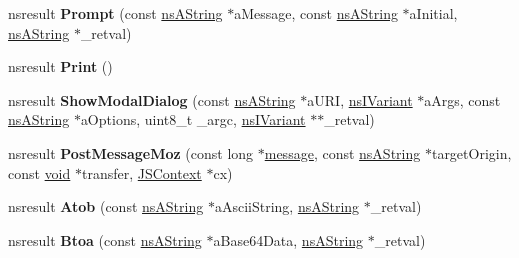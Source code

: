 \begin{DoxyCompactItemize}
\item 
\mbox{\label{interfacens_i_d_o_m_window_a2884a167e66df8a1244ed3f14c9dc761}} 
nsresult {\bfseries Prompt} (const \hyperlink{structns_string_container}{ns\+A\+String} $\ast$a\+Message, const \hyperlink{structns_string_container}{ns\+A\+String} $\ast$a\+Initial, \hyperlink{structns_string_container}{ns\+A\+String} $\ast$\+\_\+retval)
\item 
\mbox{\label{interfacens_i_d_o_m_window_a48d51e6f241246ffabd195caabcfeed3}} 
nsresult {\bfseries Print} ()
\item 
\mbox{\label{interfacens_i_d_o_m_window_a8fa1c4fe9b3890a746e86c06de2c99d9}} 
nsresult {\bfseries Show\+Modal\+Dialog} (const \hyperlink{structns_string_container}{ns\+A\+String} $\ast$a\+U\+RI, \hyperlink{interfacens_i_variant}{ns\+I\+Variant} $\ast$a\+Args, const \hyperlink{structns_string_container}{ns\+A\+String} $\ast$a\+Options, uint8\+\_\+t \+\_\+argc, \hyperlink{interfacens_i_variant}{ns\+I\+Variant} $\ast$$\ast$\+\_\+retval)
\item 
\mbox{\label{interfacens_i_d_o_m_window_afebd29a37c05ebaa535d734a63daecc9}} 
nsresult {\bfseries Post\+Message\+Moz} (const long $\ast$\hyperlink{structmessage}{message}, const \hyperlink{structns_string_container}{ns\+A\+String} $\ast$target\+Origin, const \hyperlink{interfacevoid}{void} $\ast$transfer, \hyperlink{interfacevoid}{J\+S\+Context} $\ast$cx)
\item 
\mbox{\label{interfacens_i_d_o_m_window_a3f5c53b3ee819db352c5fd3c6fd0c736}} 
nsresult {\bfseries Atob} (const \hyperlink{structns_string_container}{ns\+A\+String} $\ast$a\+Ascii\+String, \hyperlink{structns_string_container}{ns\+A\+String} $\ast$\+\_\+retval)
\item 
\mbox{\label{interfacens_i_d_o_m_window_a1405c6680fa889c94fac9070bde88020}} 
nsresult {\bfseries Btoa} (const \hyperlink{structns_string_container}{ns\+A\+String} $\ast$a\+Base64\+Data, \hyperlink{structns_string_container}{ns\+A\+String} $\ast$\+\_\+retval)
\item 
\mbox{\label{interfacens_i_d_o_m_window_a3a764028c14ad83b1cd381c9b5c41dd1}} 
$$
\end{DoxyCompactItemize}
